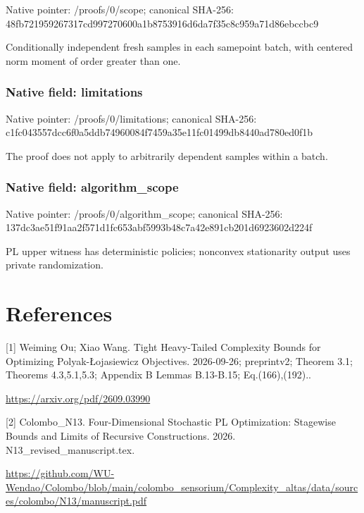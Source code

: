 \documentclass[10pt,a4paper]{article}
\begin{document}
Native pointer: /proofs/0/scope; canonical SHA-256: 48fb721959267317cd997270\allowbreak{}600a1b8753916d6da7f35c8c\allowbreak{}959a71d86ebccbc9


Conditionally independent fresh samples in each samepoint batch, with centered norm moment of order greater than one.


\subsubsection{Native field: limitations}


Native pointer: /proofs/0/limitations; canonical SHA-256: c1fc043557dcc6f0a5ddb749\allowbreak{}60084f7459a35e11fc01499d\allowbreak{}b8440ad780ed0f1b


The proof does not apply to arbitrarily dependent samples within a batch.


\subsubsection{Native field: algorithm\_scope}


Native pointer: /proofs/0/algorithm\_scope; canonical SHA-256: 137dc3ae51f91aa2f571d1fc\allowbreak{}653abf5993b48c7a42e891cb\allowbreak{}201d6923602d224f


PL upper witness has deterministic policies; nonconvex stationarity output uses private randomization.


\section{References}


[1] Weiming Ou; Xiao Wang. Tight Heavy-Tailed Complexity Bounds for Optimizing Polyak-Łojasiewicz Objectives. 2026-09-26; preprintv2; Theorem 3.1; Theorems 4.3,5.1,5.3; Appendix B Lemmas B.13-B.15; Eq.(166),(192)..



\url{https://arxiv.org/pdf/2609.03990}



[2] Colombo\_N13. Four-Dimensional Stochastic PL Optimization: Stagewise Bounds and Limits of Recursive Constructions. 2026. N13\_revised\_manuscript.tex.



\url{https://github.com/WU-Wendao/Colombo/blob/main/colombo_sensorium/Complexity_altas/data/sources/colombo/N13/manuscript.pdf}
\end{document}
